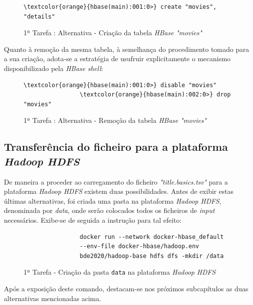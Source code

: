 \documentclass[a4paper]{report}
\begin{document}
{		\begin{figure}[H]
			{
				\color{teal}
				\begin{Verbatim}[commandchars=\\\{\}]
				\textcolor{orange}{hbase(main):001:0>} create "movies", "details"
				\end{Verbatim}
			}
			\caption{1ª Tarefa : Alternativa - Criação da tabela \textit{HBase "movies"}}
			\label{fig:7}
		\end{figure}
		
		Quanto à remoção da mesma tabela, à semelhança do procedimento tomado para a sua criação, adota-se a estratégia de usufruir explicitamente o mecanismo disponibilizado pela \textit{HBase shell}:
		\begin{figure}[H]
			{
				\color{teal}
				\begin{Verbatim}[commandchars=\\\{\}]
				\textcolor{orange}{hbase(main):001:0>} disable "movies"
				\textcolor{orange}{hbase(main):002:0>} drop "movies"
				\end{Verbatim}
			}
			\caption{1ª Tarefa : Alternativa - Remoção da tabela \textit{HBase "movies"}}
			\label{fig:8}
		\end{figure}
		
		\subsection{Transferência do ficheiro para a plataforma \textit{Hadoop HDFS}} \label{subsec:Task1-2}
		De maneira a proceder ao carregamento do ficheiro \textit{"title.basics.tsv"} para a plataforma \textit{Hadoop HDFS} existem duas possibilidades.
		Antes de exibir estas últimas alternativas, foi criada uma pasta na plataforma \textit{Hadoop HDFS}, denominada por \textit{data}, onde serão colocados todos os ficheiros de \textit{input} necessários.
		Exibe-se de seguida a instrução para tal efeito:
		\begin{figure}[H]
			{
				\color{teal}
				\begin{verbatim}
				docker run --network docker-hbase_default
				--env-file docker-hbase/hadoop.env
				bde2020/hadoop-base hdfs dfs -mkdir /data
				\end{verbatim}
			}
			\caption{1ª Tarefa - Criação da pasta \texttt{data} na plataforma \textit{Hadoop HDFS}}
			\label{fig:9}
		\end{figure}
		
		Após a exposição deste comando, destacam-se nos próximos subcapítulos as duas alternativas mencionadas acima.
		
}
\end{document}
